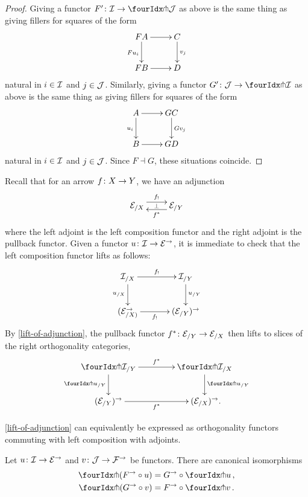 \documentclass[reqno,10pt,a4paper,oneside,draft]{amsart}
\begin{document}
\begin{proof}
Giving a functor $F' \co \cal{I} \to \liftl{\cal{J}}$ as above is the same thing as giving fillers for squares of the form
\[
\xymatrix{
  FA \ar[d]_{F u_i} \ar[r] & C \ar[d]^{v_j} \\
  FB \ar[r] & D
}
\]
natural in $i \in \cal{I}$ and $j \in \cal{J}$.
Similarly, giving a functor $G' \co \cal{J} \to \liftl{\cal{I}}$ as above is the same thing as giving fillers for squares of the form
\[
\xymatrix{
  A \ar[d]_{u_i} \ar[r] & GC \ar[d]^{Gv_j} \\
  B \ar[r] & GD
}
\]
natural in $i \in \cal{I}$ and $j \in \cal{J}$.
Since $F \dashv G$, these situations coincide.
\end{proof}

\begin{example} \label{exa:composition-pullback-lift} 
Recall that for an arrow $f \co X \to Y$, we have an adjunction 
\[
\xymatrix{
\cal{E}_{/X} \ar@<1ex>[r]^{f_{!}} \ar@{}[r]|{\bot} & \cal{E}_{/Y} \ar@<1ex>[l]^{f^*}} 
\]
where the left adjoint is the left composition functor and the right adjoint is the pullback functor. 
Given a functor $u \co \cal{I} \to \cal{E}^\to$, it is immediate to check that the left composition
functor lifts as follows:
\[
\xymatrix@C+1em{
  \cal{I}_{/X}
  \ar[r]^-{f_!}
  \ar[d]_{u_{/X}}
&
  \cal{I}_{/Y}
  \ar[d]^{u_{/Y}}
\\
  (\calE_{/X)}^\to
  \ar[r]_-{f_!}
&
  (\calE_{/Y})^\to
}
\]
By \cref{lift-of-adjunction}, the pullback functor $f^* \co \cal{E}_{/Y} \to \cal{E}_{/X}$ then lifts to slices of the right orthogonality categories,
\[
\xymatrix@C=1.5cm{
  \liftr{\cal{I}}_{/Y}
  \ar[d]_{\liftr{u}_{/Y}}
  \ar[r]^{f^*}
&
  \liftr{\cal{I}}_{/X}
  \ar[d]^{\liftr{u}_{/Y}}
\\
  (\catE_{/Y})^\to
  \ar[r]_{f^*}
&
  (\catE_{/X})^\to \rlap{.}
}
\]
\end{example}




\cref{lift-of-adjunction} can equivalently be expressed as orthogonality functors commuting with left composition with adjoints.


\begin{corollary} \label{pitchfork-adjunction}
Let $u \co \cal{I} \to \cal{E}^\to$ and $v \co \cal{J} \to \cal{F}^\to$ be functors. There are canonical isomorphisms
\begin{align*}
  \liftr{(F^\to \cc u)} &= G^\to \cc \liftr{u}
\, ,\\
  \liftl{(G^\to \cc v)} &= F^\to \cc \liftl{v}
\, .
\end{align*}
\end{corollary}
\end{document}

